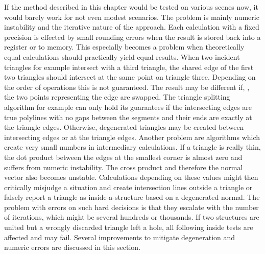 If the method described in this chapter would be tested on various scenes now, it would barely work for not even modest scenarios.
The problem is mainly numeric instability and the iterative nature of the approach.
Each calculation with a fixed precision is effected by small rounding errors when the result is stored back into a register or to memory.
This especially becomes a problem when theoretically equal calculations should practically yield equal results.
When two incident triangles for example intersect with a third triangle, the shared edge of the first two triangles should intersect at the same point on triangle three.
Depending on the order of operations this is not guaranteed.
The result may be different if, \eg, the two points representing the edge are swapped.
%
The triangle splitting algorithm for example can only hold its guarantees if the intersecting edges are true polylines with no gaps between the segments and their ends are exactly at the triangle edges.
Otherwise, degenerated triangles may be created between intersecting edges or at the triangle edges.
%
Another problem are algorithms which create very small numbers in intermediary calculations.
If a triangle is really thin, the dot product between the edges at the smallest corner is almost zero and suffers from numeric instability.
The cross product and therefore the normal vector also becomes unstable.
Calculations depending on these values might then critically misjudge a situation and \eg create intersection lines outside a triangle or falsely report a triangle as inside-a-structure based on a degenerated normal.
The problem with errors on such hard decisions is that they escalate with the number of iterations, which might be several hundreds or thousands.
If two structures are united but a wrongly discarded triangle left a hole, all following inside tests are affected and may fail.
Several improvements to mitigate degeneration and numeric errors are discussed in this section.

